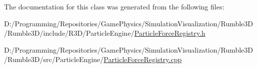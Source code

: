 The documentation for this class was generated from the following files\+:\begin{DoxyCompactItemize}
\item 
D\+:/\+Programming/\+Repositories/\+Game\+Physics/\+Simulation\+Visualization/\+Rumble3\+D/\+Rumble3\+D/include/\+R3\+D/\+Particle\+Engine/\mbox{\hyperlink{_particle_force_registry_8h}{Particle\+Force\+Registry.\+h}}\item 
D\+:/\+Programming/\+Repositories/\+Game\+Physics/\+Simulation\+Visualization/\+Rumble3\+D/\+Rumble3\+D/src/\+Particle\+Engine/\mbox{\hyperlink{_particle_force_registry_8cpp}{Particle\+Force\+Registry.\+cpp}}\end{DoxyCompactItemize}
